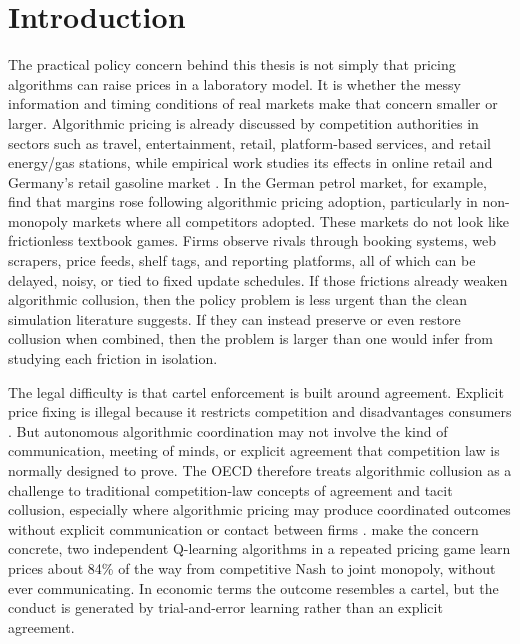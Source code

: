 \section{Introduction}
\label{sec:introduction}

The practical policy concern behind this thesis is not simply that pricing algorithms can raise prices in a laboratory model. It is whether the messy information and timing conditions of real markets make that concern smaller or larger. Algorithmic pricing is already discussed by competition authorities in sectors such as travel, entertainment, retail, platform-based services, and retail energy/gas stations, while empirical work studies its effects in online retail and Germany’s retail gasoline market \citep{oecd2025,brown2023,assad2024}. In the German petrol market, for example, \citet{assad2024} find that margins rose following algorithmic pricing adoption, particularly in non-monopoly markets where all competitors adopted. These markets do not look like frictionless textbook games. Firms observe rivals through booking systems, web scrapers, price feeds, shelf tags, and reporting platforms, all of which can be delayed, noisy, or tied to fixed update schedules. If those frictions already weaken algorithmic collusion, then the policy problem is less urgent than the clean simulation literature suggests. If they can instead preserve or even restore collusion when combined, then the problem is larger than one would infer from studying each friction in isolation.

The legal difficulty is that cartel enforcement is built around agreement. Explicit price fixing is illegal because it restricts competition and disadvantages consumers \citep{businessgovnl}. But autonomous algorithmic coordination may not involve the kind of communication, meeting of minds, or explicit agreement that competition law is normally designed to prove. The OECD therefore treats algorithmic collusion as a challenge to traditional competition-law concepts of agreement and tacit collusion, especially where algorithmic pricing may produce coordinated outcomes without explicit communication or contact between firms \citep{oecd2017,oecd2025}. \citet{calvano2020} make the concern concrete, two independent Q-learning algorithms in a repeated pricing game learn prices about 84\% of the way from competitive Nash to joint monopoly, without ever communicating. In economic terms the outcome resembles a cartel, but the conduct is generated by trial-and-error learning rather than an explicit agreement.

